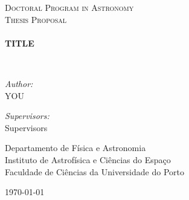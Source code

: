 \begin{titlepage}
\begin{center}


\textsc{\LARGE Doctoral Program in Astronomy}\\[1.5cm]

\textsc{\Large Thesis Proposal}\\[0.5cm]

~\\[0.4cm]

{ \Large \bfseries TITLE \\[0.4cm] }

~\\[1.5cm]

\begin{minipage}{0.5\textwidth}
\begin{flushleft} \large
\emph{Author:}\\
YOU
\end{flushleft}
\end{minipage}
\begin{minipage}{0.4\textwidth}
\begin{flushright} \large
\emph{Supervisors:} \\
Supervisors
\end{flushright}
\end{minipage}

\vfill 

{\large
Departamento de Física e Astronomia\\[.2cm]
Instituto de Astrofísica e Ciências do Espaço\\[.3cm]
Faculdade de Ciências da Universidade do Porto
}

\vfill

{\large \today}

\end{center}
\end{titlepage}